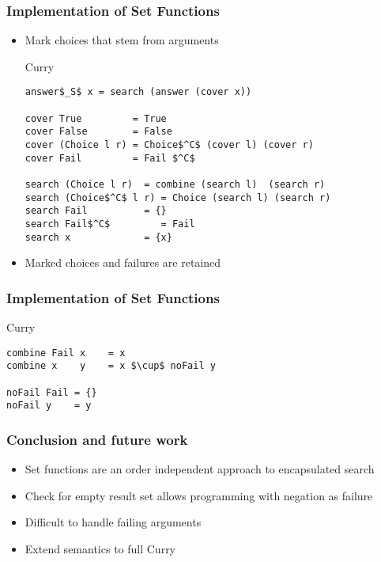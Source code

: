 \documentclass[utf8]{beamer}
\begin{document}
\begin{frame}[fragile]
\frametitle{Implementation of Set Functions}
\begin{itemize}
\item Mark choices that stem from arguments
\begin{block}{Curry}
\begin{lstlisting}[mathescape]
answer$_S$ x = search (answer (cover x))

cover True         = True
cover False        = False
cover (Choice l r) = Choice$^C$ (cover l) (cover r)
cover Fail         = Fail $^C$

search (Choice l r)  = combine (search l)  (search r)
search (Choice$^C$ l r) = Choice (search l) (search r)
search Fail          = {}
search Fail$^C$         = Fail
search x             = {x}
\end{lstlisting}
\end{block}
\item Marked choices and failures are retained 
\end{itemize}
\end{frame}

\begin{frame}[fragile]
\frametitle{Implementation of Set Functions}
\begin{block}{Curry}
\begin{lstlisting}[mathescape]
combine Fail x    = x
combine x    y    = x $\cup$ noFail y

noFail Fail = {}
noFail y    = y
\end{lstlisting}
\end{block}
\end{frame}


\begin{frame}
\frametitle{Conclusion and future work}
\begin{itemize}
\item Set functions are an order independent approach to encapsulated
      search
\item Check for empty result set allows programming with negation as failure
\item Difficult to handle failing arguments
\item Extend semantics to full Curry
\end{itemize}
\end{frame}
\end{document}
